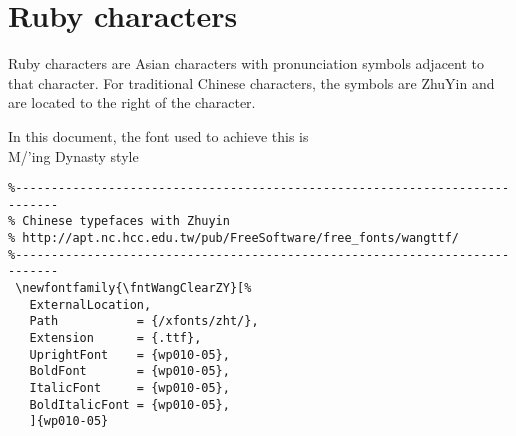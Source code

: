 \section{Ruby characters}
\begin{minipage}{\tw-70mm}
Ruby characters are Asian characters with pronunciation symbols adjacent to that character.
For traditional Chinese characters, the symbols are ZhuYin and are located to the right of the character.
\end{minipage}%
\hfill%

In this document, the font used to achieve this is
\\\indentx
{}
 {M/'ing Dynasty}
   {style}

\begin{lstlisting}
%----------------------------------------------------------------------------
% Chinese typefaces with Zhuyin
% http://apt.nc.hcc.edu.tw/pub/FreeSoftware/free_fonts/wangttf/
%----------------------------------------------------------------------------
 \newfontfamily{\fntWangClearZY}[%
   ExternalLocation,
   Path           = {/xfonts/zht/},
   Extension      = {.ttf},
   UprightFont    = {wp010-05},
   BoldFont       = {wp010-05},
   ItalicFont     = {wp010-05},
   BoldItalicFont = {wp010-05},
   ]{wp010-05}
\end{lstlisting}

